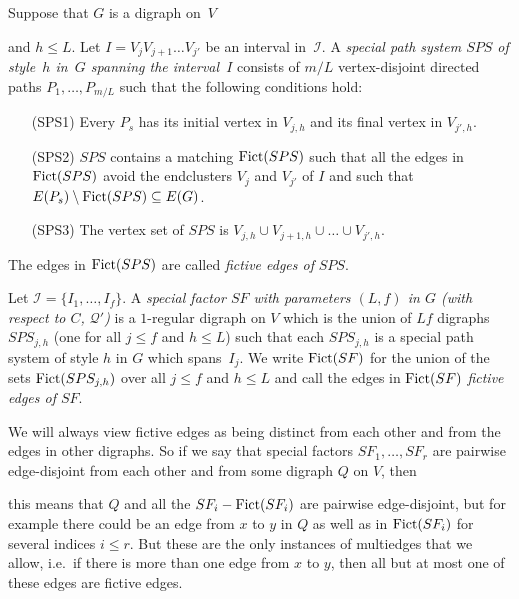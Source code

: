 \documentclass{memo-l}
\def\COMMENT#1{}
\numberwithin{section}{chapter}
\numberwithin{equation}{section}
\numberwithin{firstthm}{section}
\numberwithin{figure}{section}
\begin{document}
Suppose that $G$ is a digraph on~$V$%
	\COMMENT{We will take $G = G^{*}_A$ with $V = A $ and $G = G^{*}_B$ with $V =B$.}
and $h\le L$. Let $I=V_jV_{j+1}\dots V_{j'}$ be an interval in~$\mathcal{I}$.
A \emph{special path system $SPS$ of style~$h$ in~$G$ 
spanning the interval~$I$} consists of $m/L$
vertex-disjoint directed paths $P_1,\dots,P_{m/L}$ such that the following conditions hold:
\begin{itemize}
\item[(SPS1)] Every $P_s$ has its initial vertex in $V_{j,h}$ and its final vertex in $V_{j',h}$.
\item[(SPS2)] $SPS$ contains a matching ${\rm Fict}(SPS)$ such that all the edges in ${\rm Fict}(SPS)$ avoid the
endclusters $V_j$ and $V_{j'}$ of $I$ and such that $E(P_s)\setminus {\rm Fict}(SPS)\subseteq E(G)$.
\item[(SPS3)] The vertex set of $SPS$ is $V_{j,h}\cup V_{j+1,h}\cup \dots \cup  V_{j',h}$.
\end{itemize}
The edges in ${\rm Fict}(SPS)$ are called \emph{fictive edges of} $SPS$.

Let $\mathcal{I}=\{I_1,\dots,I_f\}$.
A \emph{special factor $SF$ with parameters $(L,f)$ in $G$ (with respect to $C$, $\mathcal{Q}'$)} is a $1$-regular digraph on $V$
which is the union of $Lf$ digraphs $SPS_{j,h}$ (one for all $j\le f$ and $h\le L$) such that each $SPS_{j,h}$ is
a special path system of style $h$ in $G$ which spans~$I_j$.
We write ${\rm Fict}(SF)$ for the union of the sets ${\rm Fict}(SPS_{j,h})$ over all $j\le f$ and $h\le L$
and call the edges in ${\rm Fict}(SF)$ \emph{fictive edges of $SF$}.

We will always view fictive edges as being distinct from each other and from the edges in other digraphs.
So if we say that special factors $SF_1,\dots,SF_r$ are pairwise edge-disjoint from each other and from some digraph $Q$ on $V$,
then%
   \COMMENT{It's not enough to have this for all $Q\subseteq G$ since in the robust decomposition lemma $H$ need not be a subgraph of $G$.}
this means that $Q$ and all the $SF_i- {\rm Fict}(SF_i)$
are pairwise edge-disjoint, but for example there could be an edge from $x$ to $y$ in $Q$ as well as in ${\rm Fict}(SF_i)$ 
for several indices $i\le r$.
But these are the only instances of multiedges that we allow, i.e.~if there is more than one edge from $x$ to $y$, then all but
at most one of these edges are fictive edges.
\end{document}
